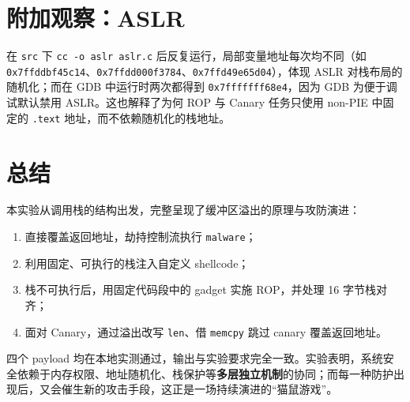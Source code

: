 \documentclass[11pt,a4paper]{article}
\begin{document}
\section{附加观察：ASLR}

在 \texttt{src} 下 \texttt{cc -o aslr aslr.c} 后反复运行，局部变量地址每次均不同（如 \texttt{0x7ffddbf45c14}、\texttt{0x7ffdd000f3784}、\texttt{0x7ffd49e65d04}），体现 ASLR 对栈布局的随机化；而在 GDB 中运行时两次都得到 \texttt{0x7fffffff68e4}，因为 GDB 为便于调试默认禁用 ASLR。这也解释了为何 ROP 与 Canary 任务只使用 non-PIE 中固定的 \texttt{.text} 地址，而不依赖随机化的栈地址。

\section{总结}

本实验从调用栈的结构出发，完整呈现了缓冲区溢出的原理与攻防演进：

\begin{enumerate}[leftmargin=2em]
  \item 直接覆盖返回地址，劫持控制流执行 \texttt{malware}；
  \item 利用固定、可执行的栈注入自定义 shellcode；
  \item 栈不可执行后，用固定代码段中的 gadget 实施 ROP，并处理 16 字节栈对齐；
  \item 面对 Canary，通过溢出改写 \texttt{len}、借 \texttt{memcpy} 跳过 canary 覆盖返回地址。
\end{enumerate}

四个 payload 均在本地实测通过，输出与实验要求完全一致。实验表明，系统安全依赖于内存权限、地址随机化、栈保护等\textbf{多层独立机制}的协同；而每一种防护出现后，又会催生新的攻击手段，这正是一场持续演进的“猫鼠游戏”。
\end{document}

